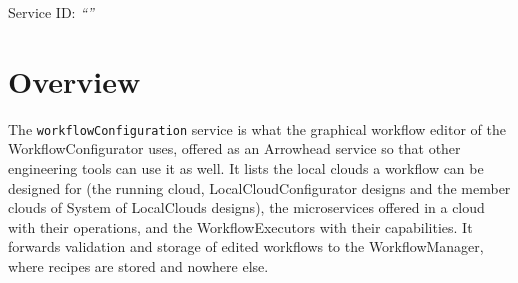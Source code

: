 \documentclass[a4paper]{arrowhead}
\begin{document}
\ArrowheadSetup

\begin{center}
  \vspace*{1cm}
  \huge{\arrowtitle}

  \vspace*{0.2cm}
  \LARGE{\arrowtype}
  \vspace*{1cm}

  \Large{Service ID: \textit{``\arrowid''}}
  \vspace*{\fill}

  

  \vspace*{1cm}
  \vspace*{\fill}

  \begin{abstract}
    This document describes the \texttt{workflow\allowbreak{}Configuration} service of the Eclipse Arrowhead workflow support systems, which lists configured local clouds, their microservices and executors, and validates and stores edited workflows. It is provided by the WorkflowConfigurator system, service version 1.0.0, documentation edition 5.4.0.
  \end{abstract}

  \vspace*{1cm}
\end{center}

\newpage

\tableofcontents
\newpage

\section{Overview}
\label{sec:overview}
The \texttt{workflow\allowbreak{}Configuration} service is what the graphical workflow editor of the
WorkflowConfigurator uses, offered as an Arrowhead service so that other engineering tools can use it as well. It
lists the local clouds a workflow can be designed for (the running cloud, LocalCloudConfigurator designs and the member
clouds of System of LocalClouds designs), the microservices offered in a cloud with their operations, and the
WorkflowExecutors with their capabilities. It forwards validation and storage of edited workflows to the
WorkflowManager, where recipes are stored and nowhere else.
\end{document}
